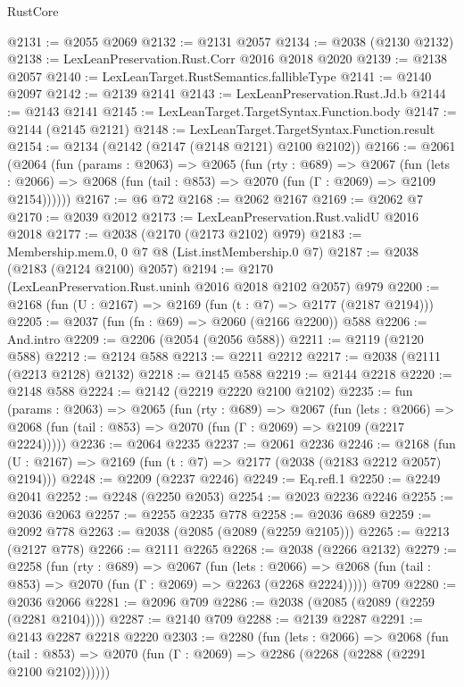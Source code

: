 \begin{lexlean}{RustCore}
\begin{coremodule}
@2131 := @2055 @2069
@2132 := @2131 @2057
@2134 := @2038 (@2130 @2132)
@2138 := LexLeanPreservation.Rust.Corr @2016 @2018 @2020
@2139 := @2138 @2057
@2140 := LexLeanTarget.RustSemantics.fallibleType
@2141 := @2140 @2097
@2142 := @2139 @2141
@2143 := LexLeanPreservation.Rust.Jd.b
@2144 := @2143 @2141
@2145 := LexLeanTarget.TargetSyntax.Function.body
@2147 := @2144 (@2145 @2121)
@2148 := LexLeanTarget.TargetSyntax.Function.result
@2154 := @2134 (@2142 (@2147 (@2148 @2121) @2100 @2102))
@2166 := @2061
    (@2064
      (fun (params : @2063) =>
      @2065
        (fun (rty : @689) =>
        @2067
          (fun (lets : @2066) =>
          @2068 (fun (tail : @853) => @2070 (fun (Γ : @2069) => @2109 @2154))))))
@2167 := @6 @72
@2168 := @2062 @2167
@2169 := @2062 @7
@2170 := @2039 @2012
@2173 := LexLeanPreservation.Rust.validU @2016 @2018
@2177 := @2038 (@2170 (@2173 @2102) @979)
@2183 := Membership.mem.{0, 0} @7 @8 (List.instMembership.{0} @7)
@2187 := @2038 (@2183 (@2124 @2100) @2057)
@2194 := @2170 (LexLeanPreservation.Rust.uninh @2016 @2018 @2102 @2057) @979
@2200 := @2168 (fun (U : @2167) => @2169 (fun (t : @7) => @2177 (@2187 @2194)))
@2205 := @2037 (fun (fn : @69) => @2060 (@2166 @2200)) @588
@2206 := And.intro
@2209 := @2206 (@2054 (@2056 @588))
@2211 := @2119 (@2120 @588)
@2212 := @2124 @588
@2213 := @2211 @2212
@2217 := @2038 (@2111 (@2213 @2128) @2132)
@2218 := @2145 @588
@2219 := @2144 @2218
@2220 := @2148 @588
@2224 := @2142 (@2219 @2220 @2100 @2102)
@2235 := fun (params : @2063) =>
  @2065
    (fun (rty : @689) =>
    @2067
      (fun (lets : @2066) =>
      @2068 (fun (tail : @853) => @2070 (fun (Γ : @2069) => @2109 (@2217 @2224)))))
@2236 := @2064 @2235
@2237 := @2061 @2236
@2246 := @2168 (fun (U : @2167) => @2169 (fun (t : @7) => @2177 (@2038 (@2183 @2212 @2057) @2194)))
@2248 := @2209 (@2237 @2246)
@2249 := Eq.refl.{1}
@2250 := @2249 @2041
@2252 := @2248 (@2250 @2053)
@2254 := @2023 @2236 @2246
@2255 := @2036 @2063
@2257 := @2255 @2235 @778
@2258 := @2036 @689
@2259 := @2092 @778
@2263 := @2038 (@2085 (@2089 (@2259 @2105)))
@2265 := @2213 (@2127 @778)
@2266 := @2111 @2265
@2268 := @2038 (@2266 @2132)
@2279 := @2258
    (fun (rty : @689) =>
    @2067
      (fun (lets : @2066) =>
      @2068 (fun (tail : @853) => @2070 (fun (Γ : @2069) => @2263 (@2268 @2224)))))
    @709
@2280 := @2036 @2066
@2281 := @2096 @709
@2286 := @2038 (@2085 (@2089 (@2259 (@2281 @2104))))
@2287 := @2140 @709
@2288 := @2139 @2287
@2291 := @2143 @2287 @2218 @2220
@2303 := @2280
    (fun (lets : @2066) =>
    @2068
      (fun (tail : @853) => @2070 (fun (Γ : @2069) => @2286 (@2268 (@2288 (@2291 @2100 @2102))))))

\end{coremodule}
\end{lexlean}
